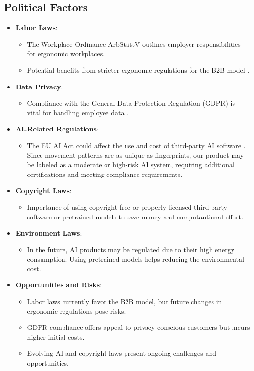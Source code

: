 \subsection{Political Factors}

\begin{itemize}
  \item \textbf{Labor Laws}:
  \begin{itemize}
    \item The Workplace Ordinance ArbStättV outlines employer responsibilities for ergonomic workplaces.
    \item Potential benefits from stricter ergonomic regulations for the B2B model \autocite{ArbStattV}.
  \end{itemize}

  \item \textbf{Data Privacy}:
  \begin{itemize}
    \item Compliance with the General Data Protection Regulation (GDPR) is vital for handling employee data \autocite{GDPR}.
  \end{itemize}

  \item \textbf{AI-Related Regulations}:
  \begin{itemize}
    \item The EU AI Act could affect the use and cost of third-party AI software \autocite{EUAIACT}. 
    Since movement patterns are as unique as fingerprints, our product may be labeled as a moderate or high-risk AI system, requiring additional certifications and meeting compliance requirements.
  \end{itemize}

  \item \textbf{Copyright Laws}:
  \begin{itemize}
    \item Importance of using copyright-free or properly licensed third-party software or pretrained models \autocite{CopyrightLaws} to save money and computantional effort. 
  \end{itemize}

  \item \textbf{Environment Laws}:
  \begin{itemize}
    \item In the future, AI products may be regulated due to their high energy consumption. Using pretrained models helps reducing the environmental cost.
  \end{itemize}

  \item \textbf{Opportunities and Risks}:
  \begin{itemize}
    \item Labor laws currently favor the B2B model, but future changes in ergonomic regulations pose risks.
    \item GDPR compliance offers appeal to privacy-conscious customers but incurs higher initial costs.
    \item Evolving AI and copyright laws present ongoing challenges and opportunities.
  \end{itemize}
\end{itemize}


